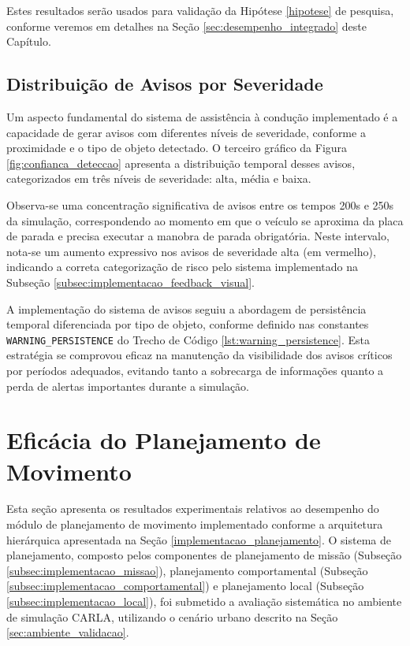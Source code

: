 Estes resultados serão usados para validação da Hipótese \ref{hipotese} de pesquisa, conforme veremos em detalhes na Seção \ref{sec:desempenho_integrado} deste Capítulo. 

\subsection{Distribuição de Avisos por Severidade} \label{subsec:dist_avisos}

Um aspecto fundamental do sistema de assistência à condução implementado é a capacidade de gerar avisos com diferentes níveis de severidade, conforme a proximidade e o tipo de objeto detectado. O terceiro gráfico da Figura \ref{fig:confianca_deteccao} apresenta a distribuição temporal desses avisos, categorizados em três níveis de severidade: alta, média e baixa.

Observa-se uma concentração significativa de avisos entre os tempos 200s e 250s da simulação, correspondendo ao momento em que o veículo se aproxima da placa de parada e precisa executar a manobra de parada obrigatória. Neste intervalo, nota-se um aumento expressivo nos avisos de severidade alta (em vermelho), indicando a correta categorização de risco pelo sistema implementado na Subseção \ref{subsec:implementacao_feedback_visual}.

A implementação do sistema de avisos seguiu a abordagem de persistência temporal diferenciada por tipo de objeto, conforme definido nas constantes \texttt{WARNING\_PERSISTENCE} do Trecho de Código \ref{lst:warning_persistence}. Esta estratégia se comprovou eficaz na manutenção da visibilidade dos avisos críticos por períodos adequados, evitando tanto a sobrecarga de informações quanto a perda de alertas importantes durante a simulação.

\section{Eficácia do Planejamento de Movimento} \label{sec:eficacia_planejamento}

Esta seção apresenta os resultados experimentais relativos ao desempenho do módulo de planejamento de movimento implementado conforme a arquitetura hierárquica apresentada na Seção \ref{implementacao_planejamento}. O sistema de planejamento, composto pelos componentes de planejamento de missão (Subseção \ref{subsec:implementacao_missao}), planejamento comportamental (Subseção \ref{subsec:implementacao_comportamental}) e planejamento local (Subseção \ref{subsec:implementacao_local}), foi submetido a avaliação sistemática no ambiente de simulação CARLA, utilizando o cenário urbano descrito na Seção \ref{sec:ambiente_validacao}.

